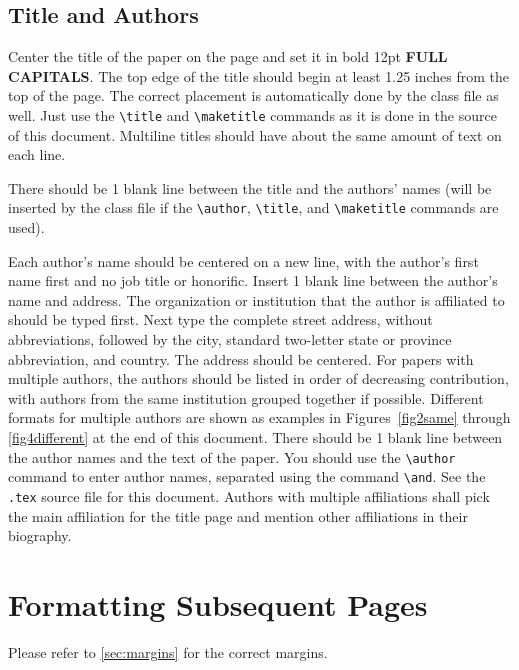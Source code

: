 \documentclass{scspaperproc}
\theoremstyle{scsthe}
\begin{document}
\subsection{Title and Authors}

Center the title of the paper on the page and set it in bold 12pt \textbf{\uppercase{full capitals}}. The top edge of the title should begin at least 1.25 inches from the top of the page. The correct placement is automatically done by the class file as well. Just use the \verb+\title+ and \verb+\maketitle+ commands as it is done in the source of this document. Multiline titles should have about the same amount of text on each line.

There should be 1 blank line between the title and the authors’ names (will be inserted by the class file if the \verb+\author+, \verb+\title+, and \verb+\maketitle+ commands are used).

Each author’s name should be centered on a new line, with the author’s first name first and no job title or honorific. Insert 1 blank line between the author’s name and address. The organization or institution that the author is affiliated to should be typed first. Next type the complete street address, without abbreviations, followed by the city, standard two-letter state or province abbreviation, and country. The address should be centered. For papers with multiple authors, the authors should be listed in order of decreasing contribution, with authors from the same institution grouped together if possible. Different formats for multiple authors are shown as examples in Figures~\ref{fig2same} through \ref{fig4different} at the end of this document. There should be 1 blank line between the author names and the text of the paper. You should use the \verb+\author+ command to enter author names, separated using the command \verb+\and+. See the \texttt{.tex} source file for this document. Authors with multiple affiliations shall pick the main affiliation for the title page and mention other affiliations in their biography.


\section{Formatting Subsequent Pages}
Please refer to \autoref{sec:margins} for the correct margins.
\end{document}
